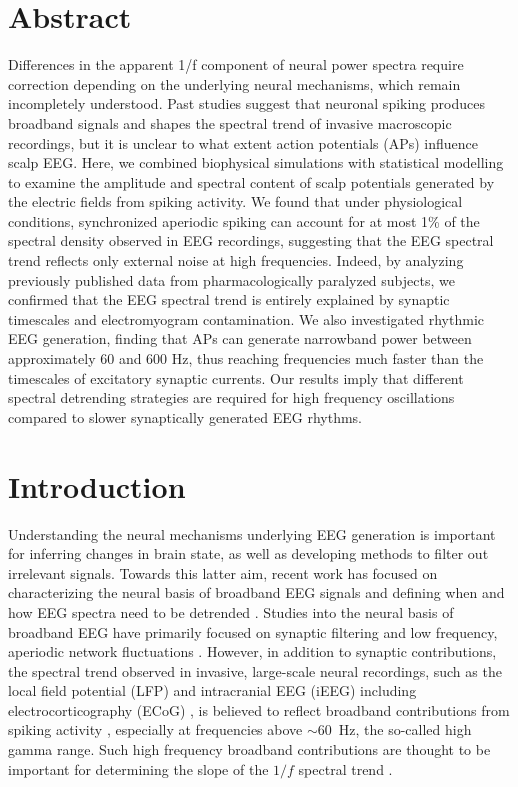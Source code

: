 \section{Abstract}
Differences in the apparent 1/f component of neural power spectra require correction depending on the underlying neural mechanisms, which remain incompletely understood. Past studies suggest that neuronal spiking produces broadband signals and shapes the spectral trend of invasive macroscopic recordings, but it is unclear to what extent action potentials (APs) influence scalp EEG. Here, we combined biophysical simulations with statistical modelling to examine the amplitude and spectral content of scalp potentials generated by the electric fields from spiking activity. We found that under physiological conditions, synchronized aperiodic spiking can account for at most 1\% of the spectral density observed in EEG recordings, suggesting that the EEG spectral trend reflects only external noise at high frequencies. Indeed, by analyzing previously published data from pharmacologically paralyzed subjects, we confirmed that the EEG spectral trend is entirely explained by synaptic timescales and electromyogram contamination. We also investigated rhythmic EEG generation, finding that APs can generate narrowband power between approximately 60 and 600 Hz, thus reaching frequencies much faster than the timescales of excitatory synaptic currents. Our results imply that different spectral detrending strategies are required for high frequency oscillations compared to slower synaptically generated EEG rhythms.


\section{Introduction}
Understanding the neural mechanisms underlying EEG generation is important for inferring changes in brain state, as well as developing methods to filter out irrelevant signals. Towards this latter aim, recent work has focused on characterizing the neural basis of broadband EEG signals and defining when and how EEG spectra need to be detrended \cite{Donoghue2020, Gerster2022, Brake2024}. Studies into the neural basis of broadband EEG have primarily focused on synaptic filtering \cite{Brake2024,Gao2017,Miller2009,Bedard2006} and low frequency, aperiodic network fluctuations \cite{Brake2024, Chaudhuri2018, Lombardi2017}. However, in addition to synaptic contributions, the spectral trend observed in invasive, large-scale neural recordings, such as the local field potential (LFP) \cite{Ray2008, Ray2011, Kayser2003} and intracranial EEG (iEEG) \cite{Vidal2010, Lachaux2005} including electrocorticography (ECoG) \cite{Podvalny2015, Miller2007, Canolty2006, Crone2006}, is believed to reflect broadband contributions from spiking activity \cite{Ray2008, Ray2011, Manning2009}, especially at frequencies above ${\sim}60$~\unit{\hertz}, the so-called high gamma range. Such high frequency broadband contributions are thought to be important for determining the slope of the $1/f$ spectral trend \cite{Gao2016}.

